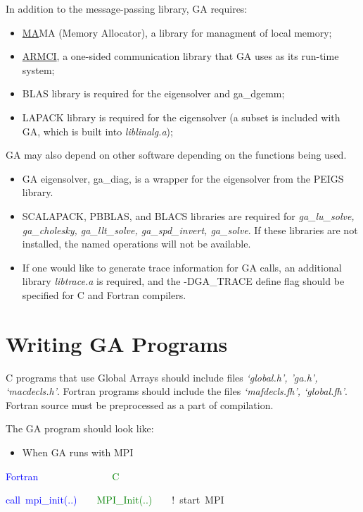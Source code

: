 In addition to the message-passing library, GA requires:
\begin{itemize}
\item \href{https://hpc.pnl.gov/globalarrays/ma/MAapi.html}{MA}MA (Memory
Allocator), a library for managment of local memory; 
\item \href{https://hpc.pnl.gov/armci/}{ARMCI}, a one-sided
communication library that GA uses as its run-time system; 
\item BLAS library is required for the eigensolver and ga\_dgemm; 
\item LAPACK library is required for the eigensolver (a subset is included
with GA, which is built into \emph{liblinalg.a});
\end{itemize}
GA may also depend on other software depending on the functions being
used.
\begin{itemize}
\item GA eigensolver, ga\_diag, is a wrapper for the eigensolver from the
PEIGS library.
\item SCALAPACK, PBBLAS, and BLACS libraries are required for \emph{ga\_lu\_solve,
ga\_cholesky, ga\_llt\_solve, ga\_spd\_invert, ga\_solve}. If these
libraries are not installed, the named operations will not be available. 
\item If one would like to generate trace information for GA calls, an additional
library \emph{libtrace.a} is required, and the -DGA\_TRACE define
flag should be specified for C and Fortran compilers.
\end{itemize}

\section{Writing GA Programs }

C programs that use Global Arrays should include files \emph{`global.h',
'ga.h', `macdecls.h'}. Fortran programs should include the files \emph{`mafdecls.fh',
`global.fh'}. Fortran source must be preprocessed as a part of compilation.

The GA program should look like:
\begin{itemize}
\item When GA runs with MPI\end{itemize}

\textcolor{blue}{Fortran~}~~~~~~~~~~~~~~\textcolor{green}{C}

\textcolor{blue}{call~mpi\_init(..)~}~~~\textcolor{green}{MPI\_Init(..)~}~~~!~start~MPI~

